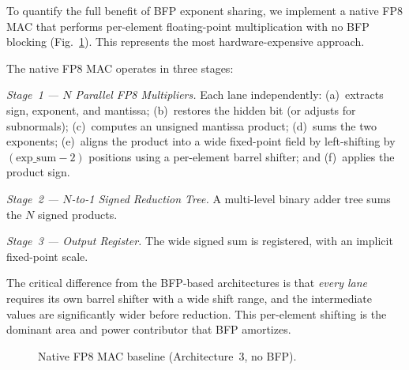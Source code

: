 \documentclass[conference]{IEEEtran}
\begin{document}
To quantify the full benefit of BFP exponent sharing, we implement
a native FP8 MAC that performs per-element floating-point
multiplication with no BFP blocking (Fig.~\ref{fig:native_arch}).
This represents the most hardware-expensive approach.

The native FP8 MAC operates in three stages:

\textit{Stage~1 --- $N$ Parallel FP8 Multipliers.}
Each lane independently: (a)~extracts sign, exponent, and mantissa;
(b)~restores the hidden bit (or adjusts for subnormals);
(c)~computes an unsigned mantissa product;
(d)~sums the two exponents;
(e)~aligns the product into a wide fixed-point field by
left-shifting by $(\text{exp\_sum} - 2)$ positions using a
per-element barrel shifter; and (f)~applies the product sign.

\textit{Stage~2 --- $N$-to-1 Signed Reduction Tree.}
A multi-level binary adder tree sums the $N$ signed products.

\textit{Stage~3 --- Output Register.}
The wide signed sum is registered, with an implicit fixed-point
scale.

The critical difference from the BFP-based architectures is that
\emph{every lane} requires its own barrel shifter with a wide shift
range, and the intermediate values are significantly wider before
reduction.  This per-element shifting is the dominant area and power
contributor that BFP amortizes.

\begin{figure}[htbp]
\centering
{}%
\caption{Native FP8 MAC baseline (Architecture~3, no BFP).}
\label{fig:native_arch}
\end{figure}
\end{document}
